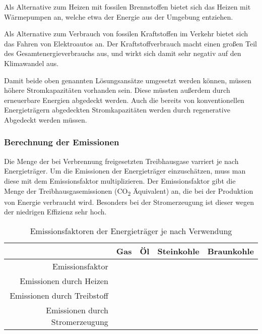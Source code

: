 \documentclass[12pt, ngerman]{article}
\begin{document}
Als Alternative zum Heizen mit fossilen Brennstoffen bietet sich
das Heizen mit Wärmepumpen an, welche etwa \unit{} der
Energie aus der Umgebung entziehen.

Als Alternative zum Verbrauch von fossilen Kraftstoffen im Verkehr bietet
sich das Fahren von Elektroautos an. Der Kraftstoffverbrauch macht einen
großen Teil des Gesamtenergieverbrauchs aus, und wirkt sich damit sehr
negativ auf den Klimawandel aus.

Damit beide oben genannten Lösungsansätze umgesetzt werden können, müssen
höhere Stromkapazitäten vorhanden sein. Diese müssten außerdem durch erneuerbare
Energien abgedeckt werden. Auch die bereits von konventionellen Energieträgern
abgedeckten Stromkapazitäten werden durch regenerative Abgedeckt werden müssen.

\subsubsection{Berechnung der Emissionen}\label{subsec:emission}

Die Menge der bei Verbrennung freigesetzten Treibhausgase varriert je
nach Energieträger. Um die Emissionen der Energieträger einzuschätzen, muss man diese mit dem Emissionsfaktor multiplizieren.
Der Emissionsfaktor gibt die Menge der Treibhausgasemissionen (CO\textsubscript{2} Äquivalent) an,
die bei der Produktion von Energie verbraucht wird.
Besonders bei der Stromerzeugung ist dieser wegen der niedrigen Effizienz sehr hoch.



\begin{table}[!htbp]
    \centering
    \begin{tabular}{r|llll}

        \toprule
         & Gas & Öl & Steinkohle & Braunkohle\\
        \midrule
        Emissionsfaktor & & & & \\
        \midrule
        Emissionen durch Heizen & & & & \\
        Emissionen durch Treibstoff & & & & \\
        Emissionen durch Stromerzeugung & & & & \\
        \bottomrule
    \end{tabular}
    \caption{Emissionsfaktoren der Energieträger je nach Verwendung\protect\footnotemark}
\end{table}
\end{document}
